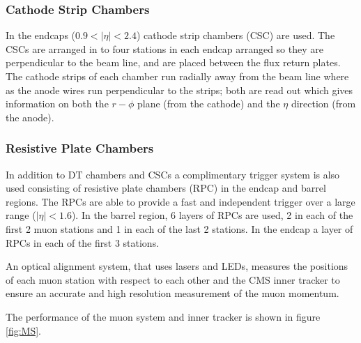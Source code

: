\subsubsection{Cathode Strip Chambers}
In the endcaps ($0.9<|\eta|<2.4$) cathode strip chambers (CSC) are used. The
CSCs are arranged in to four stations in each endcap arranged so they are
perpendicular to the beam line, and are placed between the flux return plates.
The cathode strips of each chamber run radially away from the beam line where
as the anode wires run perpendicular to the strips; both are read out which
gives information on both the $r-\phi$ plane (from the cathode) and the $\eta$
direction (from the anode). \cite{cms}

\subsubsection{Resistive Plate Chambers}
In addition to DT chambers and CSCs a complimentary trigger system is also used
consisting of resistive plate chambers (RPC) in the endcap and barrel regions.
The RPCs are able to provide a fast and independent trigger over a large range
($|\eta| < 1.6$). In the barrel region, 6 layers of RPCs are used, 2 in each of
the first 2 muon stations and 1 in each of the last 2 stations. In the endcap a
layer of RPCs in each of the first 3 stations.

An optical alignment system, that uses lasers and LEDs, measures the positions
of each muon station with respect to each other and the CMS inner tracker to
ensure an accurate and high resolution measurement of the muon
momentum.\cite{cms}

The performance of the muon system and inner tracker is shown in figure
\ref{fig:MS}.


